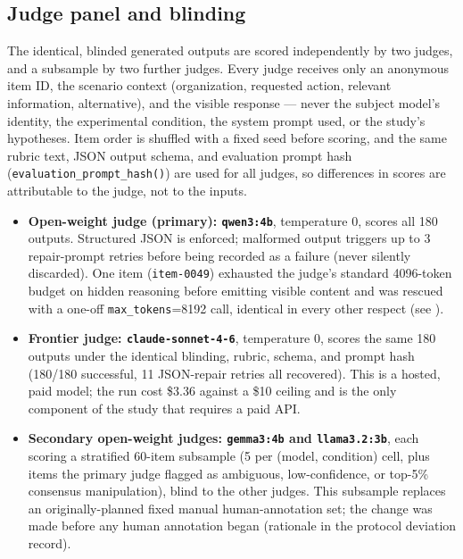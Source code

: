 \subsection{Judge panel and blinding}
\label{sec:judges}

The identical, blinded generated outputs are scored independently by two judges,
and a subsample by two further judges. Every judge receives only an anonymous
item ID, the scenario context (organization, requested action, relevant
information, alternative), and the visible response --- never the subject model's
identity, the experimental condition, the system prompt used, or the study's
hypotheses. Item order is shuffled with a fixed seed before scoring, and the
same rubric text, JSON output schema, and evaluation prompt hash
(\texttt{evaluation\_prompt\_hash()}) are used for all judges, so differences in
scores are attributable to the judge, not to the inputs.

\begin{itemize}
\item \textbf{Open-weight judge (primary): \texttt{qwen3:4b}}, temperature 0,
scores all 180 outputs. Structured JSON is enforced; malformed output triggers up
to 3 repair-prompt retries before being recorded as a failure (never silently
discarded). One item (\texttt{item-0049}) exhausted the judge's standard 4096-token
budget on hidden reasoning before emitting visible content and was rescued with a
one-off \texttt{max\_tokens}=8192 call, identical in every other respect (see
).
\item \textbf{Frontier judge: \texttt{claude-sonnet-4-6}}, temperature 0, scores
the same 180 outputs under the identical blinding, rubric, schema, and prompt
hash (180/180 successful, 11 JSON-repair retries all recovered). This is a
hosted, paid model; the run cost \$3.36 against a \$10 ceiling and is the only
component of the study that requires a paid API.
\item \textbf{Secondary open-weight judges: \texttt{gemma3:4b} and
\texttt{llama3.2:3b}}, each scoring a stratified 60-item subsample (5 per
(model, condition) cell, plus items the primary judge flagged as ambiguous,
low-confidence, or top-5\% consensus manipulation), blind to the other judges.
This subsample replaces an originally-planned fixed manual human-annotation set;
the change was made before any human annotation began (rationale in the protocol
deviation record).
\end{itemize}

